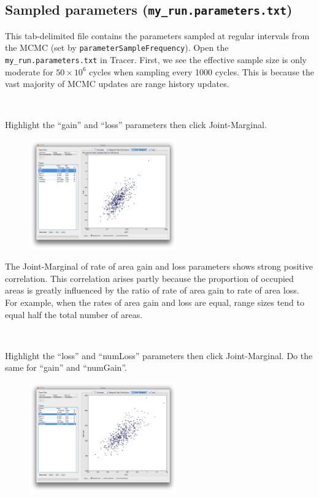 \documentclass[11pt]{article}
\newcommand{\impmark}{\strut\vadjust{\domark}}
\newcommand{\domark}{%
  \vbox to 0pt{
    \kern-\dp\strutbox
    \smash{\llap{$\rightarrow$\kern1em}}
    \vss
  }%
}
\begin{document}
\subsection{Sampled parameters (\texttt{my\_run.parameters.txt})}

This tab-delimited file contains the parameters sampled at regular intervals from the MCMC (set by \texttt{parameterSampleFrequency}).
Open the \texttt{my\_run.parameters.txt} in Tracer.
First, we see the effective sample size is only moderate for $50 \times 10^6$ cycles when sampling every 1000 cycles.
This is because the vast majority of MCMC updates are range history updates.

\noindent \\ \impmark  Highlight the ``gain'' and ``loss'' parameters then click Joint-Marginal.

\begin{figure}[H]
\centering
\includegraphics[width=2.5in]{figures/loss_gain}
\end{figure}

The Joint-Marginal of rate of area gain and loss parameters shows strong positive correlation.
This correlation arises partly because the proportion of occupied areas is greatly influenced by the ratio of rate of area gain to rate of area loss.
For example, when the rates of area gain and loss are equal, range sizes tend to equal half the total number of areas.

\noindent \\ \impmark Highlight the ``loss'' and ``numLoss'' parameters then click Joint-Marginal. Do the same for ``gain'' and ``numGain''. \\

\begin{figure}[H]
\centering
\includegraphics[width=2.5in]{figures/loss_numloss}
\end{figure}
\end{document}
